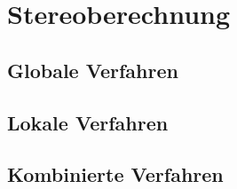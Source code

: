 \chapter{Stereoberechnung}
\section{Globale Verfahren}
\section{Lokale Verfahren}
\section{Kombinierte Verfahren}
